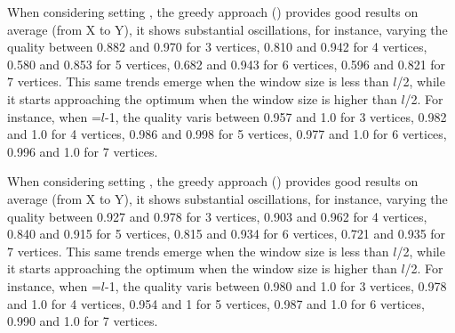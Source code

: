 When considering setting \wide, the greedy approach () provides good results on average (from X to Y), it shows substantial oscillations, for instance, varying the quality between 0.882 and 0.970 for 3 vertices, 0.810 and 0.942 for 4 vertices, 0.580 and 0.853 for 5 vertices, 0.682 and 0.943 for 6 vertices, 0.596 and 0.821 for 7 vertices. This same trends emerge when the window size is less than $l$/2, while it starts approaching the optimum when the window size is higher than $l$/2. For instance, when \windowsize=$l$-1, the quality varis between 0.957 and 1.0 for 3 vertices, 0.982 and 1.0 for 4 vertices, 0.986 and 0.998 for 5 vertices, 0.977 and 1.0 for 6 vertices, 0.996 and 1.0 for 7 vertices.

When considering setting \average, the greedy approach () provides good results on average (from X to Y), it shows substantial oscillations, for instance, varying the quality between 0.927 and 0.978 for 3 vertices, 0.903 and 0.962 for 4 vertices, 0.840 and 0.915 for 5 vertices, 0.815 and 0.934 for 6 vertices, 0.721 and 0.935 for 7 vertices. This same trends emerge when the window size is less than $l$/2, while it starts approaching the optimum when the window size is higher than $l$/2. For instance, when \windowsize=$l$-1, the quality varis between 0.980 and 1.0 for 3 vertices, 0.978 and 1.0 for 4 vertices, 0.954 and 1 for 5 vertices, 0.987 and 1.0 for 6 vertices, 0.990 and 1.0 for 7 vertices.


